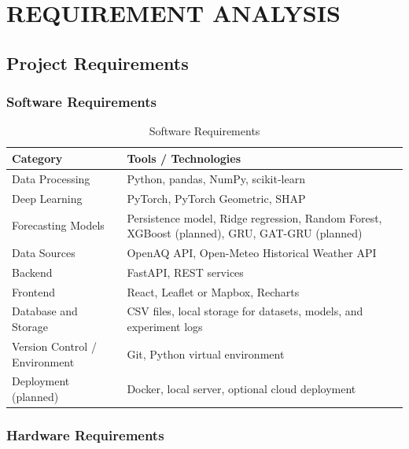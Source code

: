 \chapter{REQUIREMENT ANALYSIS}


\section{Project Requirements}


\subsection{Software Requirements}


\begin{table}[H]
    \centering
    \small
    \caption{Software Requirements}
    \label{tab:software_requirements}
    \renewcommand{\arraystretch}{1.2}
    \begin{tabularx}{0.94\linewidth}{|X|X|}
        \hline
        \textbf{Category} & \textbf{Tools / Technologies} \\
        \hline
        Data Processing & Python, pandas, NumPy, scikit-learn \\
        \hline
        Deep Learning & PyTorch, PyTorch Geometric, SHAP \\
        \hline
        Forecasting Models & Persistence model, Ridge regression, Random Forest, XGBoost (planned), GRU, GAT-GRU (planned) \\
        \hline
        Data Sources & OpenAQ API, Open-Meteo Historical Weather API \\
        \hline
        Backend & FastAPI, REST services \\
        \hline
        Frontend & React, Leaflet or Mapbox, Recharts \\
        \hline
        Database and Storage & CSV files, local storage for datasets, models, and experiment logs \\
        \hline
        Version Control / Environment & Git, Python virtual environment \\
        \hline
        Deployment (planned) & Docker, local server, optional cloud deployment \\
        \hline
    \end{tabularx}
\end{table}


\subsection{Hardware Requirements}


